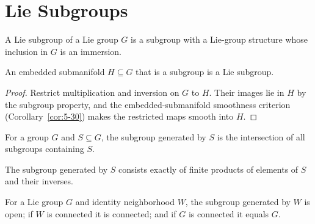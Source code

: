 \section{Lie Subgroups}

\begin{definition}
\label{def:7-49-extra-1}




A Lie subgroup of a Lie group $G$ is a subgroup with a Lie-group structure whose inclusion in $G$ is an immersion.
\end{definition}

\begin{proposition}
\label{prop:7-11}




An embedded submanifold $H\subseteq G$ that is a subgroup is a Lie subgroup.
\end{proposition}

\begin{proof}

\sketch Restrict multiplication and inversion on $G$ to $H$. Their images lie in $H$ by the subgroup property, and the embedded-submanifold smoothness criterion (Corollary~\ref{cor:5-30}) makes the restricted maps smooth into $H$.
\end{proof}

\begin{definition}
\label{def:7-49-extra-2}




For a group $G$ and $S\subseteq G$, the subgroup generated by $S$ is the intersection of all subgroups containing $S$.
\end{definition}

\begin{lemma}
\label{exer:7-13}




The subgroup generated by $S$ consists exactly of finite products of elements
of $S$ and their inverses.
\end{lemma}

\begin{proposition}
\label{prop:7-14}





For a Lie group $G$ and identity neighborhood $W$, the subgroup generated by $W$ is open; if $W$ is connected it is connected; and if $G$ is connected it equals $G$.
\end{proposition}

